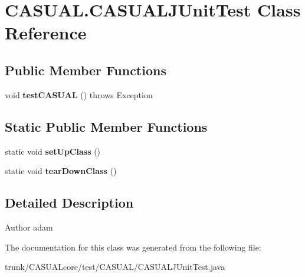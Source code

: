 \hypertarget{class_c_a_s_u_a_l_1_1_c_a_s_u_a_l_j_unit_test}{\section{C\-A\-S\-U\-A\-L.\-C\-A\-S\-U\-A\-L\-J\-Unit\-Test Class Reference}
\label{class_c_a_s_u_a_l_1_1_c_a_s_u_a_l_j_unit_test}
}
\subsection*{Public Member Functions}
\begin{DoxyCompactItemize}
\item 
\hypertarget{class_c_a_s_u_a_l_1_1_c_a_s_u_a_l_j_unit_test_af67e58268d5b80fe18aeb2aea142b7b3}{void {\bfseries test\-C\-A\-S\-U\-A\-L} ()  throws Exception }\label{class_c_a_s_u_a_l_1_1_c_a_s_u_a_l_j_unit_test_af67e58268d5b80fe18aeb2aea142b7b3}

\end{DoxyCompactItemize}
\subsection*{Static Public Member Functions}
\begin{DoxyCompactItemize}
\item 
\hypertarget{class_c_a_s_u_a_l_1_1_c_a_s_u_a_l_j_unit_test_a9980b2dad35ad98b8b71706481ef0cba}{static void {\bfseries set\-Up\-Class} ()}\label{class_c_a_s_u_a_l_1_1_c_a_s_u_a_l_j_unit_test_a9980b2dad35ad98b8b71706481ef0cba}

\item 
\hypertarget{class_c_a_s_u_a_l_1_1_c_a_s_u_a_l_j_unit_test_ad619544ffa44246299a867cfb80ef7fa}{static void {\bfseries tear\-Down\-Class} ()}\label{class_c_a_s_u_a_l_1_1_c_a_s_u_a_l_j_unit_test_ad619544ffa44246299a867cfb80ef7fa}

\end{DoxyCompactItemize}


\subsection{Detailed Description}
\begin{DoxyAuthor}{Author}
adam 
\end{DoxyAuthor}


The documentation for this class was generated from the following file\-:\begin{DoxyCompactItemize}
\item 
trunk/\-C\-A\-S\-U\-A\-Lcore/test/\-C\-A\-S\-U\-A\-L/C\-A\-S\-U\-A\-L\-J\-Unit\-Test.\-java\end{DoxyCompactItemize}
